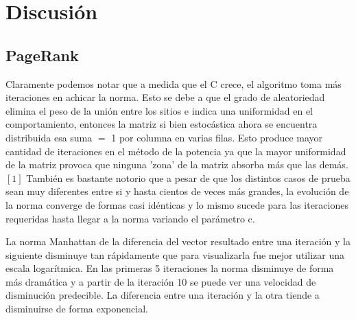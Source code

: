 \section{Discusi\'on}

\subsection{PageRank}
Claramente podemos notar que a medida que el C crece, el algoritmo toma más iteraciones en achicar la norma. Esto se debe a que el grado de aleatoriedad elimina el peso de la unión entre los sitios e indica una uniformidad en el comportamiento, entonces la matriz si bien estocástica ahora se encuentra distribuida esa suma $=$ 1 por columna en varias filas. Esto produce mayor cantidad de iteraciones en el método de la potencia ya que la mayor uniformidad de la matriz provoca que ninguna 'zona' de la matriz absorba más que las demás.   $[1]$
También es bastante notorio que a pesar de que los distintos casos de prueba sean muy diferentes entre si y hasta cientos de veces más grandes, la evolución de la norma converge de formas casi idénticas y lo mismo sucede para las iteraciones requeridas hasta llegar a la norma variando el parámetro c.

La norma Manhattan de la diferencia del vector resultado entre una iteración y la siguiente disminuye tan rápidamente que para visualizarla fue mejor utilizar una escala logarítmica. En las primeras 5 iteraciones la norma disminuye de forma más dramática y a partir de la iteración 10 se puede ver una velocidad de disminución predecible. La diferencia entre una iteración y la otra tiende a disminuirse de forma exponencial.

